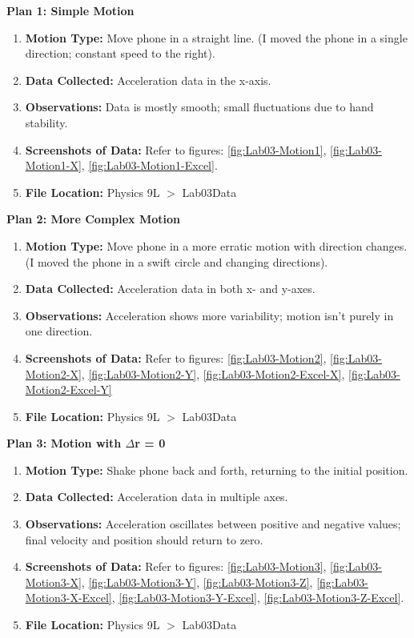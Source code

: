 \documentclass[idxtotoc,hyperref,openany]{labbook} %
\begin{document}
\hfill \break
{}
\textbf{Plan 1: Simple Motion}
\begin{enumerate}[$\bullet$]
    \item \textbf{Motion Type:} Move phone in a straight line. (I moved the phone in a single direction; constant speed to the right).
    \item \textbf{Data Collected:} Acceleration data in the x-axis.
    \item \textbf{Observations:} Data is mostly smooth; small fluctuations due to hand stability.
    \item \textbf{Screenshots of Data:} Refer to figures: \ref{fig:Lab03-Motion1}, \ref{fig:Lab03-Motion1-X}, \ref{fig:Lab03-Motion1-Excel}.
    \item \textbf{File Location:} Physics 9L $>$ Lab03\textunderscore Data
\end{enumerate}
\textbf{Plan 2: More Complex Motion}
\begin{enumerate}[$\bullet$]
    \item \textbf{Motion Type:} Move phone in a more erratic motion with direction changes. (I moved the phone in a swift circle and changing directions).
    \item \textbf{Data Collected:} Acceleration data in both x- and y-axes.
    \item \textbf{Observations:} Acceleration shows more variability; motion isn't purely in one direction.
    \item \textbf{Screenshots of Data:} Refer to figures: \ref{fig:Lab03-Motion2}, \ref{fig:Lab03-Motion2-X}, \ref{fig:Lab03-Motion2-Y}, \ref{fig:Lab03-Motion2-Excel-X}, \ref{fig:Lab03-Motion2-Excel-Y}
    \item \textbf{File Location:} Physics 9L $>$ Lab03\textunderscore Data
\end{enumerate}
\textbf{Plan 3: Motion with $\Delta$r = 0}
\begin{enumerate}[$\bullet$]
    \item \textbf{Motion Type:} Shake phone back and forth, returning to the initial position.
    \item \textbf{Data Collected:} Acceleration data in multiple axes.
    \item \textbf{Observations:} Acceleration oscillates between positive and negative values; final velocity and position should return to zero.
    \item \textbf{Screenshots of Data:} Refer to figures: \ref{fig:Lab03-Motion3}, \ref{fig:Lab03-Motion3-X}, \ref{fig:Lab03-Motion3-Y}, \ref{fig:Lab03-Motion3-Z}, \ref{fig:Lab03-Motion3-X-Excel}, \ref{fig:Lab03-Motion3-Y-Excel}, \ref{fig:Lab03-Motion3-Z-Excel}.
    \item \textbf{File Location:} Physics 9L $>$ Lab03\textunderscore Data
\end{enumerate}
\end{document}
